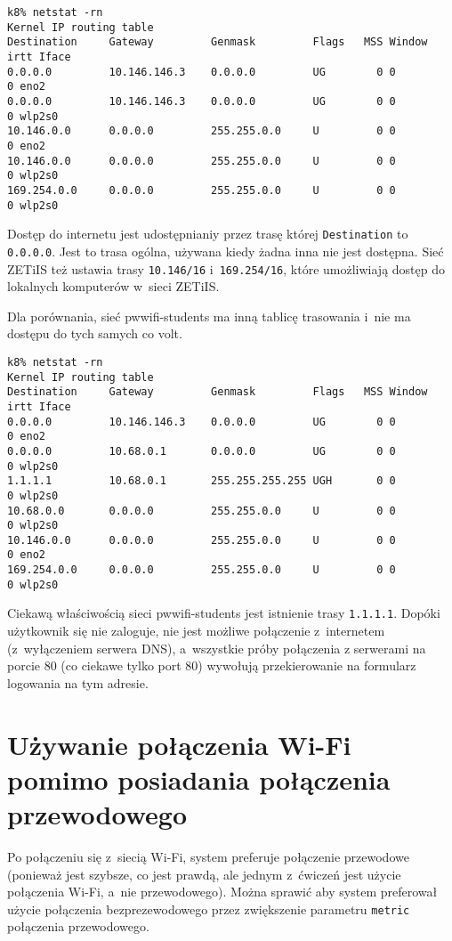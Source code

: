 \documentclass[a4paper,11pt]{article}
\begin{document}
\begin{verbatim}
k8% netstat -rn
Kernel IP routing table
Destination     Gateway         Genmask         Flags   MSS Window  irtt Iface
0.0.0.0         10.146.146.3    0.0.0.0         UG        0 0          0 eno2
0.0.0.0         10.146.146.3    0.0.0.0         UG        0 0          0 wlp2s0
10.146.0.0      0.0.0.0         255.255.0.0     U         0 0          0 eno2
10.146.0.0      0.0.0.0         255.255.0.0     U         0 0          0 wlp2s0
169.254.0.0     0.0.0.0         255.255.0.0     U         0 0          0 wlp2s0
\end{verbatim}

Dostęp do internetu jest udostępnianiy przez trasę której
\verb|Destination| to \verb|0.0.0.0|. Jest to trasa ogólna, używana
kiedy żadna inna nie jest dostępna. Sieć ZETiIS też ustawia trasy
\verb|10.146/16| i~\verb|169.254/16|, które umożliwiają dostęp do
lokalnych komputerów w~sieci ZETiIS.

Dla porównania, sieć pwwifi-students ma inną tablicę trasowania i~nie
ma dostępu do tych samych co volt.

\begin{verbatim}
k8% netstat -rn
Kernel IP routing table
Destination     Gateway         Genmask         Flags   MSS Window  irtt Iface
0.0.0.0         10.146.146.3    0.0.0.0         UG        0 0          0 eno2
0.0.0.0         10.68.0.1       0.0.0.0         UG        0 0          0 wlp2s0
1.1.1.1         10.68.0.1       255.255.255.255 UGH       0 0          0 wlp2s0
10.68.0.0       0.0.0.0         255.255.0.0     U         0 0          0 wlp2s0
10.146.0.0      0.0.0.0         255.255.0.0     U         0 0          0 eno2
169.254.0.0     0.0.0.0         255.255.0.0     U         0 0          0 wlp2s0
\end{verbatim}

Ciekawą właściwością sieci pwwifi-students jest istnienie trasy
\verb|1.1.1.1|. Dopóki użytkownik się nie zaloguje, nie jest możliwe
połączenie z~internetem (z~wyłączeniem serwera DNS), a~wszystkie
próby połączenia z serwerami na porcie 80 (co ciekawe tylko port 80)
wywołują przekierowanie na formularz logowania na tym adresie.

\section{Używanie połączenia Wi-Fi pomimo posiadania połączenia przewodowego}

Po połączeniu się z~siecią Wi-Fi, system preferuje połączenie przewodowe
(ponieważ jest szybsze, co jest prawdą, ale jednym z~ćwiczeń jest użycie
połączenia Wi-Fi, a~nie przewodowego). Można sprawić aby system preferował
użycie połączenia bezprezewodowego przez zwiększenie parametru \verb|metric|
połączenia przewodowego.
\end{document}

